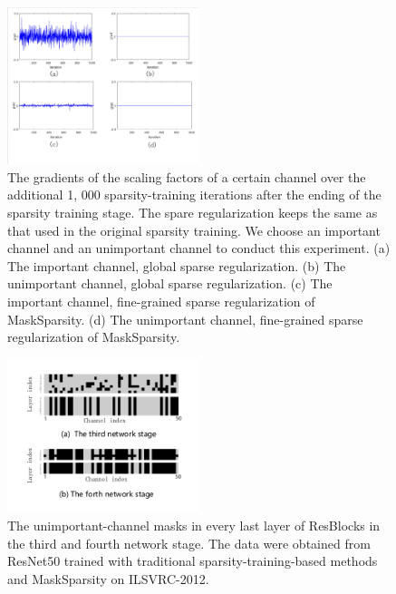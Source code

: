 \documentclass[review]{cvpr}
\begin{document}
\begin{figure}[h!]
	\begin{centering}
		\includegraphics[width=0.5\textwidth]{figure/grad2_cropped.pdf}
		\caption{The gradients of the scaling factors of a certain channel over the additional 1, 000 sparsity-training iterations after the ending of the sparsity training stage. The spare regularization keeps the same as that used in the original sparsity training. We choose an important channel and an unimportant channel to conduct this experiment. (a) The important channel, global sparse regularization. (b) The unimportant channel, global sparse regularization. (c) The important channel, fine-grained sparse regularization of MaskSparsity. (d) The unimportant channel, fine-grained sparse regularization of MaskSparsity.}
		\label{grad}
		\par\end{centering}
\end{figure}

 
\begin{figure}[h!]
	\begin{centering}
		\includegraphics[width=0.5\textwidth]{figure/stage_mask_ablationstudy.pdf} 
	    \caption{ The unimportant-channel masks in every last layer of ResBlocks in the third and fourth network stage.	The data were obtained from ResNet50 trained with traditional sparsity-training-based methods and MaskSparsity on ILSVRC-2012.
    	}
        \label{Pruning-mask-exp}
    \par\end{centering}
\end{figure}
\end{document}
